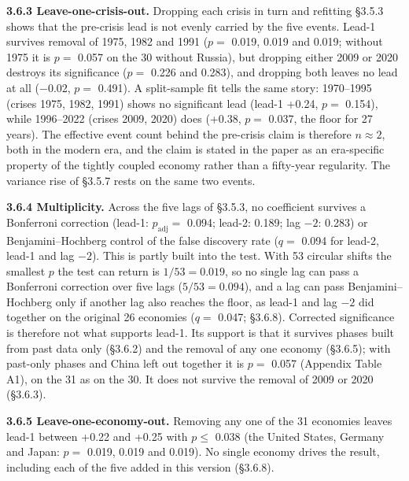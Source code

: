 \documentclass[11pt,a4paper]{article}
\begin{document}
\textbf{3.6.3 Leave-one-crisis-out.} Dropping each crisis in turn and refitting §3.5.3 shows that the pre-crisis lead is not evenly carried by the five events. Lead-1 survives removal of 1975, 1982 and 1991 (\(p =\) 0.019, 0.019 and 0.019; without 1975 it is \(p =\) 0.057 on the 30 without Russia), but dropping either 2009 or 2020 destroys its significance (\(p =\) 0.226 and 0.283), and dropping both leaves no lead at all (−0.02, \(p =\) 0.491). A split-sample fit tells the same story: 1970–1995 (crises 1975, 1982, 1991) shows no significant lead (lead-1 +0.24, \(p =\) 0.154), while 1996–2022 (crises 2009, 2020) does (+0.38, \(p =\) 0.037, the floor for 27 years). The effective event count behind the pre-crisis claim is therefore \(n \approx 2\), both in the modern era, and the claim is stated in the paper as an era-specific property of the tightly coupled economy rather than a fifty-year regularity. The variance rise of §3.5.7 rests on the same two events.

\textbf{3.6.4 Multiplicity.} Across the five lags of §3.5.3, no coefficient survives a Bonferroni correction (lead-1: \(p_{\mathrm{adj}} =\) 0.094; lead-2: 0.189; lag \(-2\): 0.283) or Benjamini–Hochberg control of the false discovery rate (\(q =\) 0.094 for lead-2, lead-1 and lag \(-2\)). This is partly built into the test. With 53 circular shifts the smallest \(p\) the test can return is \(1/53 = 0.019\), so no single lag can pass a Bonferroni correction over five lags (\(5/53 = 0.094\)), and a lag can pass Benjamini–Hochberg only if another lag also reaches the floor, as lead-1 and lag \(-2\) did together on the original 26 economies (\(q =\) 0.047; §3.6.8). Corrected significance is therefore not what supports lead-1. Its support is that it survives phases built from past data only (§3.6.2) and the removal of any one economy (§3.6.5); with past-only phases and China left out together it is \(p =\) 0.057 (Appendix Table A1), on the 31 as on the 30. It does not survive the removal of 2009 or 2020 (§3.6.3).

\textbf{3.6.5 Leave-one-economy-out.} Removing any one of the 31 economies leaves lead-1 between +0.22 and +0.25 with \(p \le\) 0.038 (the United States, Germany and Japan: \(p =\) 0.019, 0.019 and 0.019). No single economy drives the result, including each of the five added in this version (§3.6.8).
\end{document}
